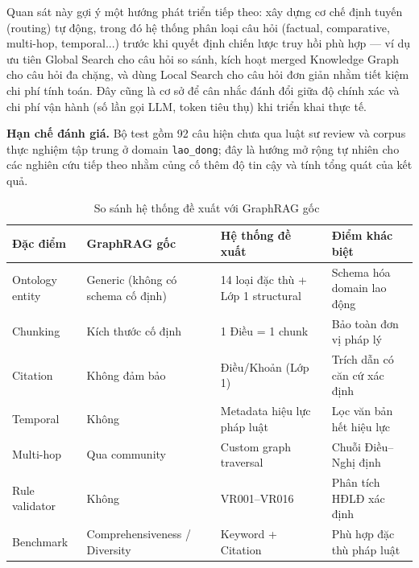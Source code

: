 \documentclass[../DoAn.tex]{subfiles}
\begin{document}
Quan sát này gợi ý một hướng phát triển tiếp theo: xây dựng cơ chế định tuyến (routing) tự động, trong đó hệ thống phân loại câu hỏi (factual, comparative, multi-hop, temporal...) trước khi quyết định chiến lược truy hồi phù hợp --- ví dụ ưu tiên Global Search cho câu hỏi so sánh, kích hoạt merged Knowledge Graph cho câu hỏi đa chặng, và dùng Local Search cho câu hỏi đơn giản nhằm tiết kiệm chi phí tính toán. Đây cũng là cơ sở để cân nhắc đánh đổi giữa độ chính xác và chi phí vận hành (số lần gọi LLM, token tiêu thụ) khi triển khai thực tế.

\textbf{Hạn chế đánh giá.} Bộ test gồm 92 câu hiện chưa qua luật sư review và corpus thực nghiệm tập trung ở domain \texttt{lao\_dong}; đây là hướng mở rộng tự nhiên cho các nghiên cứu tiếp theo nhằm củng cố thêm độ tin cậy và tính tổng quát của kết quả.
\begin{table}[H]
\centering
\caption{So sánh hệ thống đề xuất với GraphRAG gốc~\cite{graphrag2024}}
\label{table:vs_graphrag}
\small
\begin{tabular}{|l|p{3.2cm}|p{3.2cm}|p{3.2cm}|}
\hline
\textbf{Đặc điểm} & \textbf{GraphRAG gốc} & \textbf{Hệ thống đề xuất} & \textbf{Điểm khác biệt} \\
\hline
Ontology entity   & Generic (không có schema cố định) & 14 loại đặc thù + Lớp 1 structural & Schema hóa domain lao động \\
Chunking          & Kích thước cố định & 1 Điều = 1 chunk & Bảo toàn đơn vị pháp lý \\
Citation          & Không đảm bảo & Điều/Khoản (Lớp 1) & Trích dẫn có căn cứ xác định \\
Temporal          & Không          & Metadata hiệu lực pháp luật & Lọc văn bản hết hiệu lực \\
Multi-hop         & Qua community  & Custom graph traversal & Chuỗi Điều--Nghị định \\
Rule validator    & Không          & VR001--VR016               & Phân tích HĐLĐ xác định \\
Benchmark         & Comprehensiveness / Diversity & Keyword + Citation & Phù hợp đặc thù pháp luật \\
\hline
\end{tabular}
\end{table}
\end{document}
